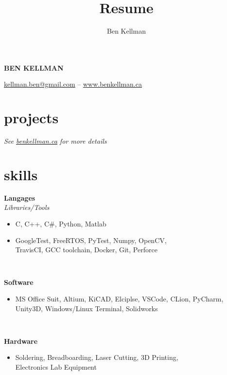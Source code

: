\documentclass{article}
\author{Ben Kellman}
\title{Resume}
\newcommand{\grayhline}{
  \noindent\makebox[\linewidth]{\textcolor{gray}{\rule{0.95\textwidth}{1pt}}}\\
}
\newcommand{\minicolumns}[2]{
  \begin{minipage}[t]{0.25\textwidth}
    \begin{flushright}
      #1
    \end{flushright}
  \end{minipage}
  \hfill
  \begin{minipage}[t]{0.7\textwidth}
    #2
  \end{minipage}
}
\newcommand{\resumeSection}[3]{
  \minicolumns{
      \textbf{#1}\\
      \textit{#2}
    }
    {
      \begin{itemize}[leftmargin=*]
          \justifying
          \setlength\itemsep{-0.1em}
          #3
      \end{itemize}
  }
  \vspace{0.5\baselineskip}
}
\begin{document}
\begin{center}
  \textbf{\LARGE{\MakeUppercase{Ben Kellman}}}

  \vspace{0.75em}
  \underline{\href{mailto: kellman.ben@gmail.com}{kellman.ben@gmail.com}} -- \underline{\href{www.BenKellman.ca}{www.benkellman.ca}}

\end{center}
\vspace{1em}

\begin{minipage}[t]{0.65\textwidth}
  \section{projects}
  
  \textit{See \underline{\href{www.benkellman.ca}{benkellman.ca}} for more details}

  \section{skills}
  \resumeSection{Langages}{Libraries/Tools}{
    \item C, C++, C\#, Python, Matlab
    \item GoogleTest, FreeRTOS, PyTest, Numpy, OpenCV,\\
    TravisCI, GCC toolchain, Docker, Git, Perforce
  }

  \grayhline
  \resumeSection{Software}{}{
    \item MS Office Suit, Altium, KiCAD, Elciplse, VSCode, CLion, PyCharm,
    Unity3D, Windows/Linux Terminal, Solidworks
  }

  \grayhline
  \resumeSection{Hardware}{}{
    \item Soldering, Breadboarding, Laser Cutting, 3D Printing,\\
    Electronics Lab Equipment
  }

\end{minipage}
\end{document}
